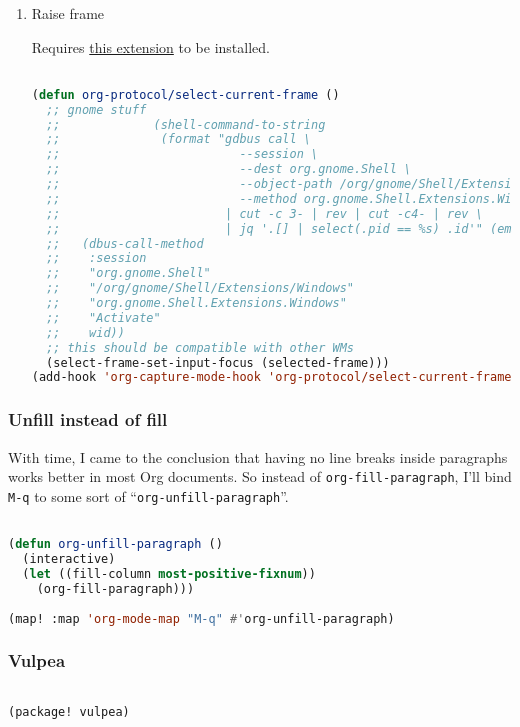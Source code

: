 \documentclass[11pt]{article}
\begin{document}
\begin{enumerate}
  \item Raise frame
  \label{sec:raise-frame}

  Requires \href{https://extensions.gnome.org/extension/4724/window-calls/}{this extension} to be installed.

\begin{lstlisting}[language=Lisp]%! Someone please complete this list for me

(defun org-protocol/select-current-frame ()
  ;; gnome stuff
  ;;             (shell-command-to-string
  ;;              (format "gdbus call \
  ;;                         --session \
  ;;                         --dest org.gnome.Shell \
  ;;                         --object-path /org/gnome/Shell/Extensions/Windows \
  ;;                         --method org.gnome.Shell.Extensions.Windows.List \
  ;;                       | cut -c 3- | rev | cut -c4- | rev \
  ;;                       | jq '.[] | select(.pid == %s) .id'" (emacs-pid))))))
  ;;   (dbus-call-method
  ;;    :session
  ;;    "org.gnome.Shell"
  ;;    "/org/gnome/Shell/Extensions/Windows"
  ;;    "org.gnome.Shell.Extensions.Windows"
  ;;    "Activate"
  ;;    wid))
  ;; this should be compatible with other WMs
  (select-frame-set-input-focus (selected-frame)))
(add-hook 'org-capture-mode-hook 'org-protocol/select-current-frame)
\end{lstlisting}
\end{enumerate}

\subsubsection{Unfill instead of fill}
\label{sec:unfill-instead-of-fill}
With time, I came to the conclusion that having no line breaks inside paragraphs works better in most Org documents. So instead of \lstinline|org-fill-paragraph|, I’ll bind \texttt{M-q} to some sort of ``\lstinline|org-unfill-paragraph|''.

\begin{lstlisting}[language=Lisp]%! Someone please complete this list for me

(defun org-unfill-paragraph ()
  (interactive)
  (let ((fill-column most-positive-fixnum))
    (org-fill-paragraph)))
 
(map! :map 'org-mode-map "M-q" #'org-unfill-paragraph)
\end{lstlisting}

\subsubsection{Vulpea}
\label{sec:vulpea}
\begin{lstlisting}[language=Lisp]%! Someone please complete this list for me

(package! vulpea)
\end{lstlisting}
\end{document}
